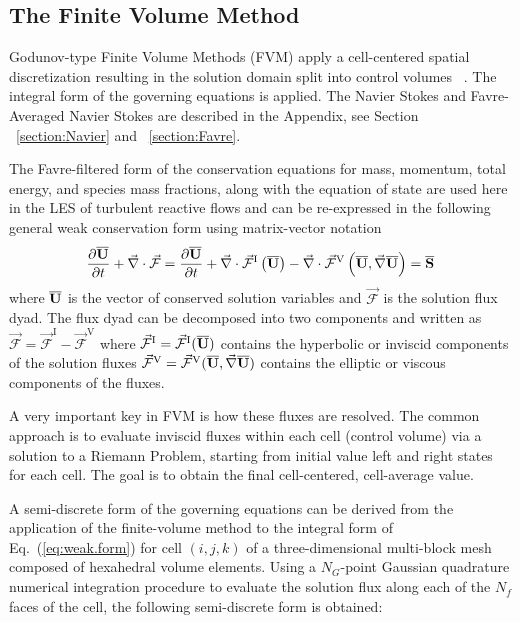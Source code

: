 \subsection{The Finite Volume Method}
Godunov-type Finite Volume Methods (FVM) apply a cell-centered spatial discretization resulting in the solution domain split into control volumes ~\cite{Toro:1997}. The integral form of the governing equations is applied. The Navier Stokes and Favre-Averaged Navier Stokes are described in the Appendix, see Section ~\ref{section:Navier} and ~\ref{section:Favre}.\par 
The Favre-filtered form of the conservation equations for mass, momentum, total energy, and species mass fractions, along with the equation of state are used here in the LES of turbulent reactive flows and can be re-expressed in the following general weak conservation form using matrix-vector notation ~\cite{Neto:2014}
\begin{equation}
\label{eq:weak.form}
\frac{\partial \overline{\mathbf{U}}}{\partial t} 
+ \vec{\nabla} \cdot \vec{\mathcal{F}} =
\frac{\partial \overline{\mathbf{U}}}{\partial t} + 
\vec{\nabla} \cdot \vec{\mathcal{F}}^{\mathrm{I}} \left( \overline{\mathbf{U}} \right) - 
\vec{\nabla} \cdot \vec{\mathcal{F}}^{\mathrm{V}} 
\left( \overline{\mathbf{U}}, \vec{\nabla} \overline{\mathbf{U}} \right) = 
\overline{\mathbf{S}}
\end{equation}
where $\overline{\mathbf{U}}$ is the vector of conserved solution variables and $\vec{\mathcal{F}}$ is the solution flux dyad.  The flux dyad can be decomposed into two components and written as $\vec{\mathcal{F}} =  \vec{\mathcal{F}}^{\mathrm I} - \vec{\mathcal{F}}^{\mathrm{V}}$ where $\vec{\mathcal{F}}^{\mathrm I} = \vec{\mathcal{F}}^{\mathrm I}(\overline{\mathbf{U}})$ contains the hyperbolic or inviscid components of the solution fluxes $\vec{\mathcal{F}}^{\mathrm{V}} =  \vec{\mathcal{F}}^{\mathrm{V}}(\overline{\mathbf{U}}, \vec{\nabla} \overline{\mathbf{U}})$ contains the elliptic or viscous components of the fluxes.

A very important key in FVM is how these fluxes are resolved. The common approach is to evaluate inviscid fluxes within each cell (control volume) via a solution to a Riemann Problem, starting from initial value left and right states for each cell. The goal is to obtain the final cell-centered, cell-average value. 

A semi-discrete form of the governing equations can be derived from the application of the finite-volume method to the integral form of Eq.~(\ref{eq:weak.form}) for cell $(i,j,k)$ of a three-dimensional multi-block mesh composed of hexahedral volume elements. Using a $N_G$-point Gaussian quadrature numerical integration procedure to evaluate the solution flux along each of the $N_f$ faces of the cell, the following semi-discrete form is obtained:

